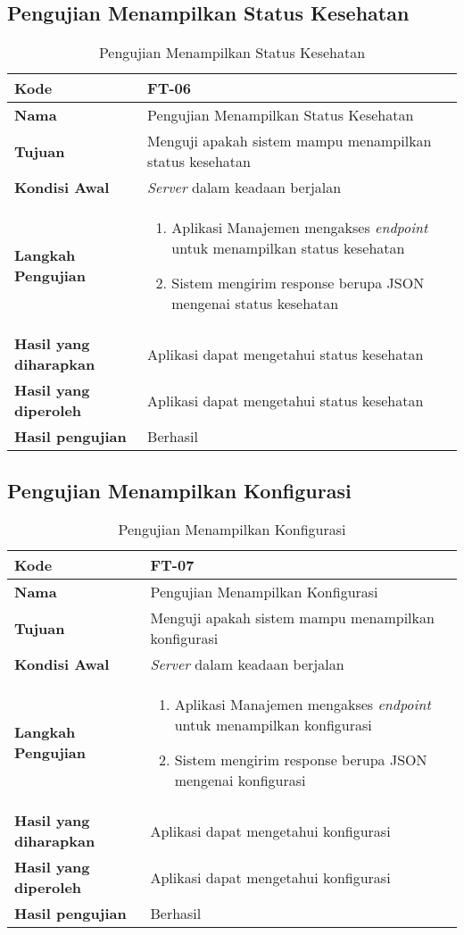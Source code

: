 \subsection{Pengujian Menampilkan Status Kesehatan}
\begin{longtable}{|p{2.5cm}|p{6.5cm}|}
	\caption{Pengujian Menampilkan Status Kesehatan} \label{t:uji_menampilkan_status_kesehatan} \\ \hline
	\textbf{Kode} & FT-06 \\ \hline
	\textbf{Nama} & Pengujian Menampilkan Status Kesehatan \\ \hline
	\textbf{Tujuan} & Menguji apakah sistem mampu menampilkan status kesehatan \\ \hline
	\textbf{Kondisi Awal} &  \textit{Server} dalam keadaan berjalan\\ \hline
	\textbf{Langkah Pengujian} &  
	\begin{enumerate}
		\item Aplikasi Manajemen mengakses \textit{endpoint} untuk menampilkan status kesehatan
		\item Sistem mengirim response berupa JSON mengenai status kesehatan
	\end{enumerate} \\ \hline
	\textbf{Hasil yang diharapkan} & Aplikasi dapat mengetahui status kesehatan \\ \hline
	\textbf{Hasil yang diperoleh} & Aplikasi dapat mengetahui status kesehatan \\ \hline
	\textbf{Hasil pengujian} & Berhasil \\ \hline
\end{longtable}
\subsection{Pengujian Menampilkan Konfigurasi}
\begin{longtable}{|p{2.5cm}|p{6.5cm}|}
	\caption{Pengujian Menampilkan Konfigurasi} \label{t:uji_menampilkan_konfigurasi} \\ \hline
	\textbf{Kode} & FT-07 \\ \hline
	\textbf{Nama} & Pengujian Menampilkan Konfigurasi \\ \hline
	\textbf{Tujuan} & Menguji apakah sistem mampu menampilkan konfigurasi \\ \hline
	\textbf{Kondisi Awal} &  \textit{Server} dalam keadaan berjalan\\ \hline
	\textbf{Langkah Pengujian} &  
	\begin{enumerate}
		\item Aplikasi Manajemen mengakses \textit{endpoint} untuk menampilkan konfigurasi
		\item Sistem mengirim response berupa JSON mengenai konfigurasi
	\end{enumerate} \\ \hline
	\textbf{Hasil yang diharapkan} & Aplikasi dapat mengetahui konfigurasi \\ \hline
	\textbf{Hasil yang diperoleh} & Aplikasi dapat mengetahui konfigurasi \\ \hline
	\textbf{Hasil pengujian} & Berhasil \\ \hline
\end{longtable}
